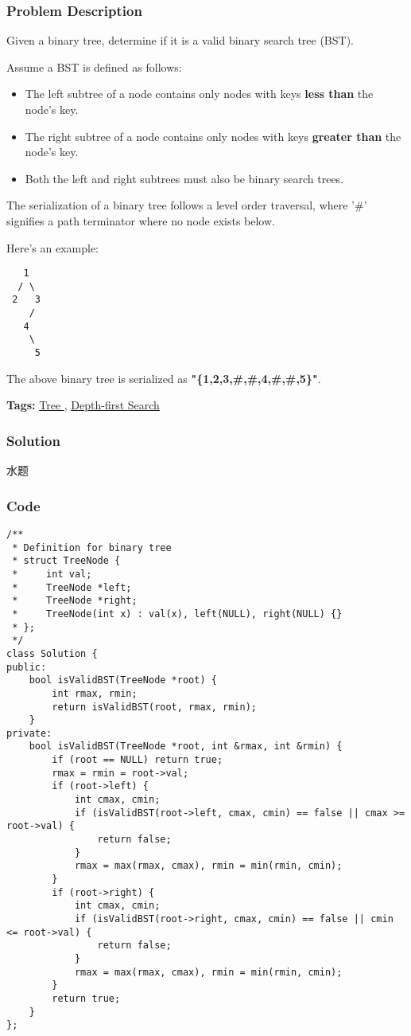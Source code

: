 \documentclass{article}
\begin{document}
\begin{CJK*}{UTF8}{gkai}
\subsubsection*{Problem Description}
Given a binary tree, determine if it is a valid binary search tree (BST).

Assume a BST is defined as follows:

\begin{itemize}
\item The left subtree of a node contains only nodes with keys \textbf{less than} the node's key.
\item The right subtree of a node contains only nodes with keys \textbf{greater than} the node's key.
\item Both the left and right subtrees must also be binary search trees.
\end{itemize}

The serialization of a binary tree follows a level order traversal, where '\#' signifies a path terminator where no node exists below.

Here's an example:


\begin{verbatim}
   1
  / \
 2   3
    /
   4
    \
     5
\end{verbatim}
The above binary tree is serialized as \textbf{"\{1,2,3,\#,\#,4,\#,\#,5\}"}.


\textbf{Tags: }
\hyperref[ Tree ]{ Tree },  \hyperref[ Depth-first Search ]{ Depth-first Search }



\subsubsection*{Solution}
水题

\subsubsection*{Code}
\begin{lstlisting}
/**
 * Definition for binary tree
 * struct TreeNode {
 *     int val;
 *     TreeNode *left;
 *     TreeNode *right;
 *     TreeNode(int x) : val(x), left(NULL), right(NULL) {}
 * };
 */
class Solution {
public:
    bool isValidBST(TreeNode *root) {
        int rmax, rmin;
        return isValidBST(root, rmax, rmin);
    }
private:
    bool isValidBST(TreeNode *root, int &rmax, int &rmin) {
        if (root == NULL) return true;
        rmax = rmin = root->val;
        if (root->left) {
            int cmax, cmin;
            if (isValidBST(root->left, cmax, cmin) == false || cmax >= root->val) {
                return false;
            }
            rmax = max(rmax, cmax), rmin = min(rmin, cmin);
        }
        if (root->right) {
            int cmax, cmin;
            if (isValidBST(root->right, cmax, cmin) == false || cmin <= root->val) {
                return false;
            }
            rmax = max(rmax, cmax), rmin = min(rmin, cmin);
        }
        return true;
    }
}; 
\end{lstlisting}



\end{CJK*}
\end{document}
